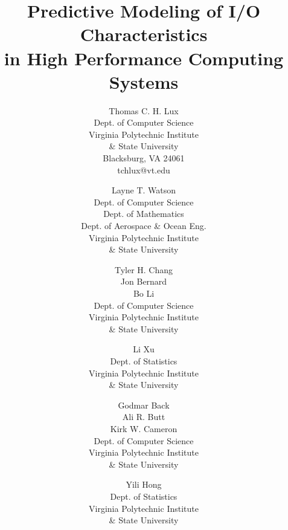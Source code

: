 \documentclass{scspaperproc}
\theoremstyle{scsthe}
\begin{document}

\def\SCSconferenceacro{SpringSim}
\def\SCSpublicationyear{2018}
\def\SCSconferencedates{April 15-18}
\def\SCSconferencevenue{Baltimore, MD, USA}
\def\SCSsymposiumacro{HPC} %

\title{Predictive Modeling of I/O Characteristics \\ in High
  Performance Computing Systems}

\author{Thomas C. H. Lux \\ [12pt]
Dept. of Computer Science \\
Virginia Polytechnic Institute\\
\& State University \\
Blacksburg, VA 24061 \\
tchlux@vt.edu \\
\and
Layne T. Watson \\[12pt]
Dept. of Computer Science\\
Dept. of Mathematics\\
Dept. of Aerospace \& Ocean Eng.\\ 
Virginia Polytechnic Institute\\
\& State University \\
\and
Tyler H. Chang\\
Jon Bernard\\
Bo Li\\[12pt]
Dept. of Computer Science\\ 
Virginia Polytechnic Institute\\
\& State University \\
\and
Li Xu\\[12pt]
Dept. of Statistics\\ 
Virginia Polytechnic Institute\\
\& State University \\
\and
Godmar Back\\
Ali R. Butt\\
Kirk W. Cameron\\[12pt]
Dept. of Computer Science\\ 
Virginia Polytechnic Institute\\
\& State University \\
\and
Yili Hong\\[12pt]
Dept. of Statistics\\ 
Virginia Polytechnic Institute\\
\& State University \\
}
\end{document}
